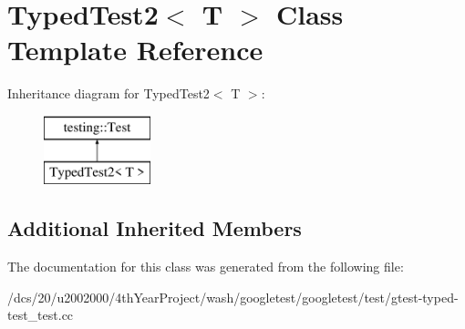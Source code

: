 \hypertarget{classTypedTest2}{}\section{Typed\+Test2$<$ T $>$ Class Template Reference}
\label{classTypedTest2}
Inheritance diagram for Typed\+Test2$<$ T $>$\+:\begin{figure}[H]
\begin{center}
\leavevmode
\includegraphics[height=2.000000cm]{classTypedTest2}
\end{center}
\end{figure}
\subsection*{Additional Inherited Members}


The documentation for this class was generated from the following file\+:\begin{DoxyCompactItemize}
\item 
/dcs/20/u2002000/4th\+Year\+Project/wash/googletest/googletest/test/gtest-\/typed-\/test\+\_\+test.\+cc\end{DoxyCompactItemize}

